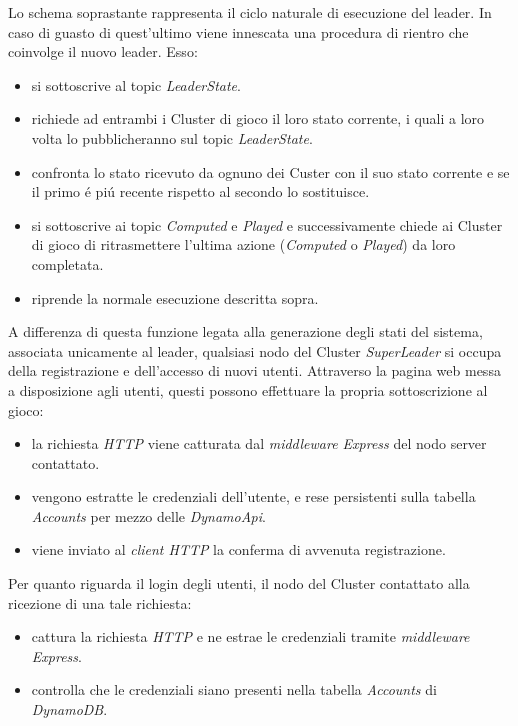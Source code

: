 \documentclass{sig-alternate-05-2015}
\begin{document}
Lo schema soprastante rappresenta il ciclo naturale di esecuzione del leader. In caso di guasto di quest'ultimo viene innescata una procedura di rientro che coinvolge il nuovo leader. Esso:
\begin{itemize}
\item si sottoscrive al topic \textit{LeaderState}.
\item richiede ad entrambi i Cluster di gioco il loro stato corrente, i quali a loro volta lo pubblicheranno sul topic \textit{LeaderState}.
\item confronta lo stato ricevuto da ognuno dei Custer con il suo stato corrente e se il primo \'e pi\'u recente rispetto al secondo lo sostituisce.
\item si sottoscrive ai topic \textit{Computed} e \textit{Played} e successivamente chiede ai Cluster di gioco di ritrasmettere l'ultima azione (\textit{Computed} o \textit{Played}) da loro completata.
\item riprende la normale esecuzione descritta sopra.
\end{itemize} 

A differenza di questa funzione legata alla generazione degli stati del sistema, associata unicamente al leader, qualsiasi nodo del Cluster \textit{SuperLeader} si occupa della registrazione e dell'accesso di nuovi utenti. Attraverso la pagina web messa a disposizione agli utenti, questi possono effettuare la propria sottoscrizione al gioco: 
\begin{itemize}
\item la richiesta \textit{HTTP} viene catturata dal \textit{middleware Express} del nodo server contattato.
\item vengono estratte le credenziali dell'utente, e rese persistenti sulla tabella \textit{Accounts} per mezzo delle \textit{DynamoApi}.
\item viene inviato al \textit{client HTTP} la conferma di avvenuta registrazione.
\end{itemize}
Per quanto riguarda il login degli utenti, il nodo del Cluster contattato alla ricezione di una tale richiesta:
\begin{itemize}
\item cattura la richiesta \textit{HTTP} e ne estrae le credenziali tramite \textit{middleware Express}.
\item controlla che le credenziali siano presenti nella tabella \textit{Accounts} di \textit{DynamoDB}.
\end{itemize}
\end{document}
